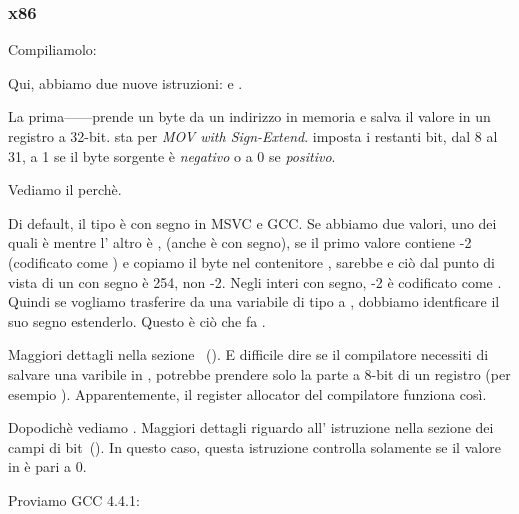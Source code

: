 \subsubsection{x86}


Compiliamolo:




Qui, abbiamo due nuove istruzioni: \MOVSX e \TEST.

\label{MOVSX}

La prima---\MOVSX---prende un byte da un indirizzo in memoria e salva il valore in un registro a 32-bit. 
\MOVSX sta per \emph{MOV with Sign-Extend}. 
\MOVSX imposta i restanti bit, dal 8 al 31, 
a 1 se il byte sorgente è \emph{negativo} o a 0 se \emph{positivo}.

Vediamo il perchè.

Di default, il tipo \Tchar è con segno in MSVC e GCC. Se abbiamo due valori, uno dei quali è \Tchar 
mentre l' altro è \Tint, (anche \Tint è con segno), se il primo valore contiene -2 (codificato come ) 
e copiamo il byte nel contenitore \Tint, sarebbe  e ciò 
dal punto di vista di un \Tint con segno è 254, non -2. Negli interi con segno, -2 è codificato come . 
Quindi se vogliamo trasferire  da una variabile di tipo \Tchar a \Tint, 
dobbiamo identficare il suo segno estenderlo. Questo è ciò che fa \MOVSX.

Maggiori dettagli nella sezione \q{\emph{\SignedNumbersSectionName}} ~().
E difficile dire se il compilatore necessiti di salvare una varibile \Tchar in \EDX, potrebbe prendere solo la parte a 8-bit di un registro 
(per esempio \DL). Apparentemente, il \gls{register allocator} del compilatore funziona così.


Dopodichè vediamo . 
Maggiori dettagli riguardo all' istruzione \TEST nella sezione dei campi di bit~().
In questo caso, questa istruzione controlla solamente se il valore in \EDX è pari a 0.


Proviamo GCC 4.4.1:



